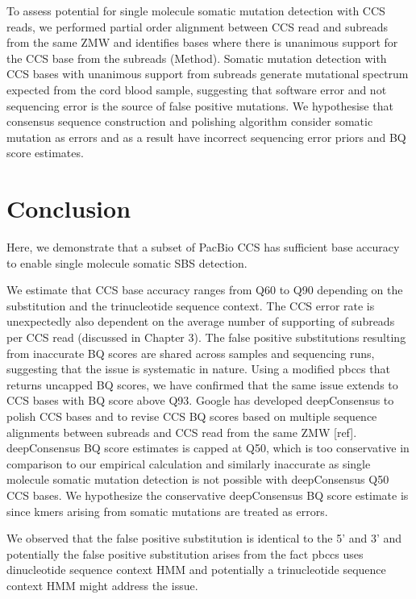 To assess potential for single molecule somatic mutation detection with CCS reads, we performed partial order alignment between CCS read and subreads from the same ZMW and identifies bases where there is unanimous support for the CCS base from the subreads (Method). Somatic mutation detection with CCS bases with unanimous support from subreads generate mutational spectrum expected from the cord blood sample, suggesting that software error and not sequencing error is the source of false positive mutations. We hypothesise that consensus sequence construction and polishing algorithm consider somatic mutation as errors and as a result have incorrect sequencing error priors and BQ score estimates. 

\section{Conclusion}

Here, we demonstrate that a subset of PacBio CCS has sufficient base accuracy to enable single molecule somatic SBS detection.

We estimate that CCS base accuracy ranges from Q60 to Q90 depending on the substitution and the trinucleotide sequence context. The CCS error rate is unexpectedly also dependent on the average number of supporting of subreads per CCS read (discussed in Chapter 3). The false positive substitutions resulting from inaccurate BQ scores are shared across samples and sequencing runs, suggesting that the issue is systematic in nature. Using a modified pbccs that returns uncapped BQ scores, we have confirmed that the same issue extends to CCS bases with BQ score above Q93. Google has developed deepConsensus to polish CCS bases and to revise CCS BQ scores based on multiple sequence alignments between subreads and CCS read from the same ZMW [ref]. deepConsensus BQ score estimates is capped at Q50, which is too conservative in comparison to our empirical calculation and similarly inaccurate as single molecule somatic mutation detection is not possible with deepConsensus Q50 CCS bases. We hypothesize the conservative deepConsensus BQ score estimate is since kmers arising from somatic mutations are treated as errors. 

We observed that the false positive substitution is identical to the 5’ and 3’ and potentially the false positive substitution arises from the fact pbccs uses dinucleotide sequence context HMM and potentially a trinucleotide sequence context HMM might address the issue. 

